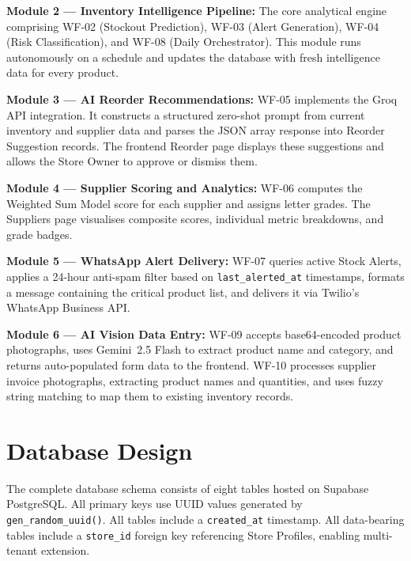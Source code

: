 \textbf{Module 2 — Inventory Intelligence Pipeline:} The core analytical engine comprising
WF-02 (Stockout Prediction), WF-03 (Alert Generation), WF-04 (Risk Classification), and
WF-08 (Daily Orchestrator). This module runs autonomously on a schedule and updates the database
with fresh intelligence data for every product.

\textbf{Module 3 — AI Reorder Recommendations:} WF-05 implements the Groq API integration.
It constructs a structured zero-shot prompt from current inventory and supplier data and parses
the JSON array response into Reorder Suggestion records. The frontend Reorder page displays these
suggestions and allows the Store Owner to approve or dismiss them.

\textbf{Module 4 — Supplier Scoring and Analytics:} WF-06 computes the Weighted Sum Model score
for each supplier and assigns letter grades. The Suppliers page visualises composite scores,
individual metric breakdowns, and grade badges.

\textbf{Module 5 — WhatsApp Alert Delivery:} WF-07 queries active Stock Alerts, applies a
24-hour anti-spam filter based on \texttt{last\_alerted\_at} timestamps, formats a message
containing the critical product list, and delivers it via Twilio's WhatsApp Business API.

\textbf{Module 6 — AI Vision Data Entry:} WF-09 accepts base64-encoded product photographs,
uses Gemini~2.5 Flash to extract product name and category, and returns auto-populated form
data to the frontend. WF-10 processes supplier invoice photographs, extracting product names
and quantities, and uses fuzzy string matching to map them to existing inventory records.

\section{Database Design}

The complete database schema consists of eight tables hosted on Supabase PostgreSQL. All primary
keys use UUID values generated by \texttt{gen\_random\_uuid()}. All tables include a
\texttt{created\_at} timestamp. All data-bearing tables include a \texttt{store\_id} foreign
key referencing Store Profiles, enabling multi-tenant extension.

